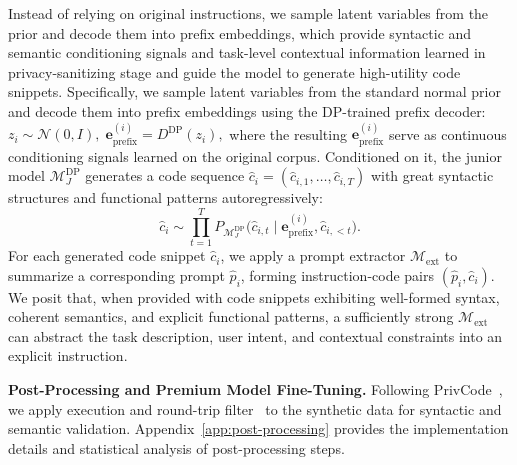 \documentclass{article}
\theoremstyle{plain}
\theoremstyle{definition}
\theoremstyle{remark}
\begin{document}
Instead of relying on original instructions, we sample latent variables from the prior and decode them into prefix embeddings, which provide syntactic and semantic conditioning signals and task-level contextual information learned in privacy-sanitizing stage and guide the model to generate high-utility code snippets. Specifically, we sample latent variables from the standard normal prior and decode them into prefix embeddings using the DP-trained prefix decoder: $
z_i \sim \mathcal{N}(0, I), \; \mathbf{e}_{\text{prefix}}^{(i)} = D^{\text{DP}}(z_i),$
where the resulting $\mathbf{e}_{\text{prefix}}^{(i)}$ serve as continuous conditioning signals learned on the original corpus. Conditioned on it, the junior model $\mathcal{M}_J^{\text{DP}}$ generates a code sequence $\hat{c}_i = (\hat{c}_{i,1}, \dots, \hat{c}_{i,T}) $ with great syntactic structures and functional patterns autoregressively:
\begin{equation}
\hat{c}_i 
\sim \prod_{t=1}^{T} 
P_{\mathcal{M}_J^{\text{DP}}}
\big(
\hat{c}_{i,t} \mid \mathbf{e}_{\text{prefix}}^{(i)}, \hat{c}_{i,<t}
\big).
\end{equation}
For each generated code snippet $\hat{c}_i$, we apply a prompt extractor $\mathcal{M}_{\text{ext}}$ to summarize a corresponding prompt $\hat{p}_i$, forming instruction-code pairs $(\hat{p}_i, \hat{c}_i)$. 
We posit that, when provided with code snippets exhibiting well-formed syntax, coherent semantics, and explicit functional patterns, a sufficiently strong $\mathcal{M}_{\text{ext}}$ can abstract the task description, user intent, and contextual constraints into an explicit instruction.



\noindent\textbf{Post-Processing and Premium Model Fine-Tuning.}
Following PrivCode~\cite{liu2025privcode}, we apply execution and round-trip filter~\cite{allamanis2024unsupervisedevaluationcodellms} to the synthetic data for syntactic and semantic validation. 
Appendix~\ref{app:post-processing} provides the implementation details and statistical analysis of post-processing steps.
\end{document}
